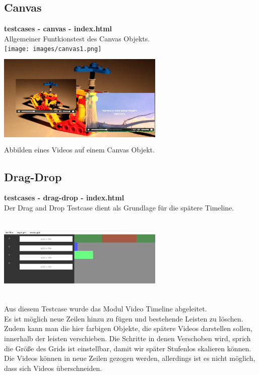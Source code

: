 \documentclass[a4paper,10pt]{scrartcl}
\begin{document}
\subsection{Canvas}
\textbf{testcases - canvas - index.html} \\
Allgemeiner Funtkionstest des Canvas Objekts.\\ 
\texttt{[image: images/canvas1.png]}\\
\includegraphics[height=176px, width=300px]{images/canvas2.png}\\
Abbilden eines Videos auf einem Canvas Objekt. 
\subsection{Drag-Drop}
\textbf{testcases - drag-drop - index.html} \\
Der Drag and Drop Testcase dient als Grundlage für die spätere Timeline.\\
\includegraphics[height=176px, width=300px]{images/draganddrop.png}\\
Aus diesem Testcase wurde das Modul Video Timeline abgeleitet.\\
Es ist möglich neue Zeilen hinzu zu fügen und bestehende Leisten zu löschen.\\
Zudem kann man die hier farbigen Objekte, die spätere Videos darstellen sollen, innerhalb der leisten verschieben. Die Schritte in denen Verschoben wird, sprich die Größe des Grids ist einstellbar, damit wir später Stufenlos skalieren können.\\
Die Videos können in neue Zeilen gezogen werden, allerdings ist es nicht möglich, dass sich Videos überschneiden. 
\end{document}

